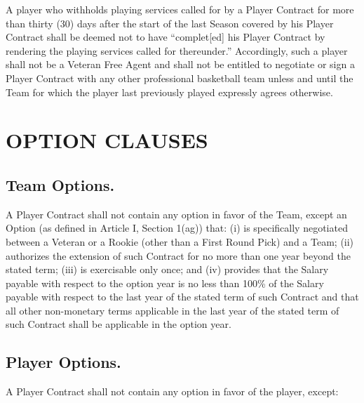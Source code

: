 \documentclass[
]{book}
\begin{document}
A player who withholds playing services called for by a Player Contract for more than thirty (30) days after the start of the last Season covered by his Player Contract shall be deemed not to have ``complet{[}ed{]} his Player Contract by rendering the playing services called for thereunder.'' Accordingly, such a player shall not be a Veteran Free Agent and shall not be entitled to negotiate or sign a Player Contract with any other professional basketball team unless and until the Team for which the player last previously played expressly agrees otherwise.

\hypertarget{option-clauses}{%
\chapter{OPTION CLAUSES}\label{option-clauses}}

\hypertarget{team-options.}{%
\section{Team Options.}\label{team-options.}}

A Player Contract shall not contain any option in favor of the Team, except an Option (as defined in Article I, Section 1(ag)) that: (i) is specifically negotiated between a Veteran or a Rookie (other than a First Round Pick) and a Team; (ii) authorizes the extension of such Contract for no more than one year beyond the stated term; (iii) is exercisable only once; and (iv) provides that the Salary payable with respect to the option year is no less than 100\% of the Salary payable with respect to the last year of the stated term of such Contract and that all other non-monetary terms applicable in the last year of the stated term of such Contract shall be applicable in the option year.

\hypertarget{player-options.}{%
\section{Player Options.}\label{player-options.}}

A Player Contract shall not contain any option in favor of the player, except:
\end{document}
